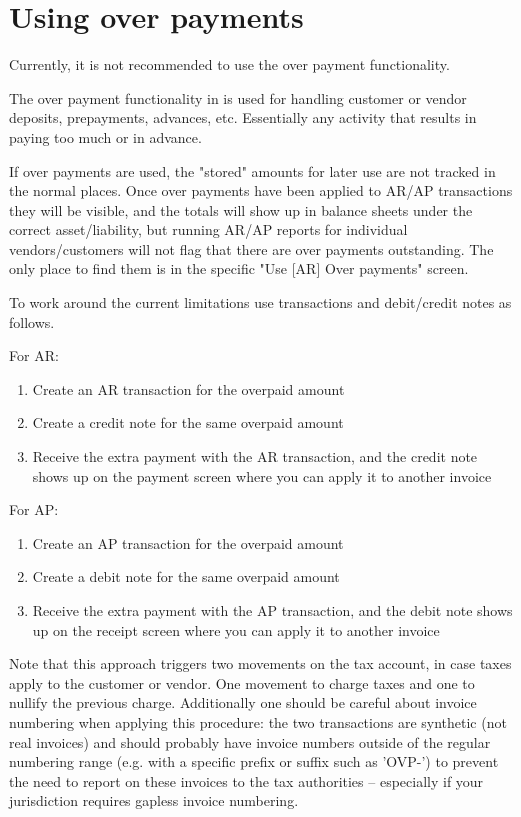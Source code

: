 
\section{Using over payments}
\label{sec-business-processes-payment-processing-overpayments}

Currently, it is not recommended to use the over payment functionality.

The \gls{over payment} functionality in \lsmbsp is used for handling customer or vendor deposits, 
prepayments, advances, etc.  
Essentially any activity that results in paying too much or in advance.

If over payments are used, the "stored" amounts for later use are not tracked in the normal places. Once over payments have been applied to AR/AP transactions they will be visible, and the totals will show up in balance sheets under the correct asset/liability, but running AR/AP reports for individual vendors/customers will not flag that there are over payments outstanding. The only place to find them is in the specific "Use [AR] Over payments" screen.

To work around the current limitations use transactions and debit/credit notes as follows.

For AR:
\begin{enumerate}
    \item Create an AR transaction for the overpaid amount
    \item Create a credit note for the same overpaid amount
    \item Receive the extra payment with the AR transaction, and the credit note shows up on the payment screen where you can apply it to another invoice
\end{enumerate}

For AP:
\begin{enumerate}
    \item Create an AP transaction for the overpaid amount
    \item Create a debit note for the same overpaid amount
    \item Receive the extra payment with the AP transaction, and the debit note shows up on the receipt screen where you can apply it to another invoice
\end{enumerate}


Note that this approach triggers two movements on the tax account, in case taxes apply to the customer or vendor. One movement to charge taxes and one to nullify the previous charge.  Additionally one should be careful about invoice numbering when applying this procedure: the two transactions are synthetic (not real invoices) and should probably have invoice numbers outside of the regular numbering range (e.g. with a specific prefix or suffix such as 'OVP-') to prevent the need to report on these invoices to the tax authorities -- especially if your jurisdiction requires gapless invoice numbering.


